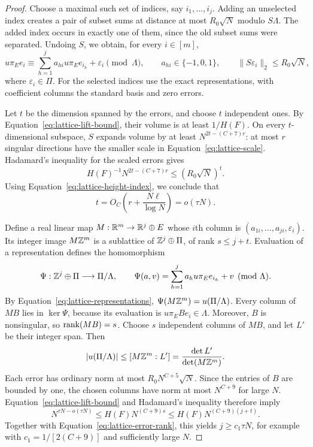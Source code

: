 \begin{proof}
Choose a maximal such set of indices, say $i_1,\ldots,i_j$.
Adding an unselected index creates a pair of subset sums at distance
at most $R_0\sqrt N$ modulo $S\Lambda$.  The added index occurs in
exactly one of them, since the old subset sums were separated.
Undoing $S$, we obtain, for every $i\in[m]$,
\begin{equation}\label{eq:lattice-representations}
 u\pi_Ee_i\equiv
 \sum_{h=1}^j a_{hi}u\pi_Ee_{i_h}+\varepsilon_i
       \pmod\Lambda,
 \qquad a_{hi}\in\{-1,0,1\},
 \qquad\lVert S\varepsilon_i\rVert_2\le R_0\sqrt N,
\end{equation}
where $\varepsilon_i\in\Pi$.  For the selected indices use the exact
representations, with coefficient columns the standard basis and
zero errors.

Let $t$ be the dimension spanned by the errors, and choose $t$
independent ones.  By Equation~\eqref{eq:lattice-lift-bound}, their
volume is at least $1/H(F)$.  On every $t$-dimensional subspace, $S$
expands volume by at least $N^{2t-(C+7)r}$: at most $r$ singular
directions have the smaller scale in Equation~\eqref{eq:lattice-scale}.
Hadamard's inequality for the scaled errors gives
\[
 H(F)^{-1}N^{2t-(C+7)r}\le(R_0\sqrt N)^t.
\]
Using Equation~\eqref{eq:lattice-height-index}, we conclude that
\begin{equation}\label{eq:lattice-error-rank}
 t=O_C\left(r+\frac{N\ell}{\log N}\right)=o(\tau N).
\end{equation}

Define a real linear map $M:\mathbb R^m\to\mathbb R^j\oplus E$ whose $i$th
column is $(a_{1i},\ldots,a_{ji},\varepsilon_i)$.
Its integer image $M\mathbb Z^m$ is a sublattice of $\mathbb Z^j\oplus\Pi$,
of rank $s\le j+t$.  Evaluation of a representation defines the
homomorphism
\[
 \Psi:\mathbb Z^j\oplus\Pi\longrightarrow\Pi/\Lambda,
 \qquad
 \Psi(a,v)=\sum_{h=1}^j a_hu\pi_Ee_{i_h}+v\pmod\Lambda.
\]
By Equation~\eqref{eq:lattice-representations},
$\Psi(M\mathbb Z^m)=u(\Pi/\Lambda)$.
Every column of $MB$ lies in $\ker\Psi$, because its evaluation is
$u\pi_EBe_i\in\Lambda$.  Moreover, $B$ is nonsingular, so
$\operatorname{rank}(MB)=s$.  Choose $s$ independent columns of $MB$, and let
$L'$ be their integer span.  Then
\[
 |u(\Pi/\Lambda)|\le[M\mathbb Z^m:L']
       =\frac{\det L'}{\det(M\mathbb Z^m)}.
\]
Each error has ordinary norm at most $R_0N^{C+5}\sqrt N$.
Since the entries of $B$ are bounded by one, the chosen columns have
norm at most $N^{C+9}$ for large $N$.  Equation~\eqref{eq:lattice-lift-bound}
and Hadamard's inequality therefore imply
\[
 N^{\tau N-o(\tau N)}
 \le H(F)N^{(C+9)s}
 \le H(F)N^{(C+9)(j+t)}.
\]
Together with Equation~\eqref{eq:lattice-error-rank}, this yields
$j\ge c_1\tau N$, for example with $c_1=1/[2(C+9)]$ and sufficiently
large $N$.
\end{proof}

